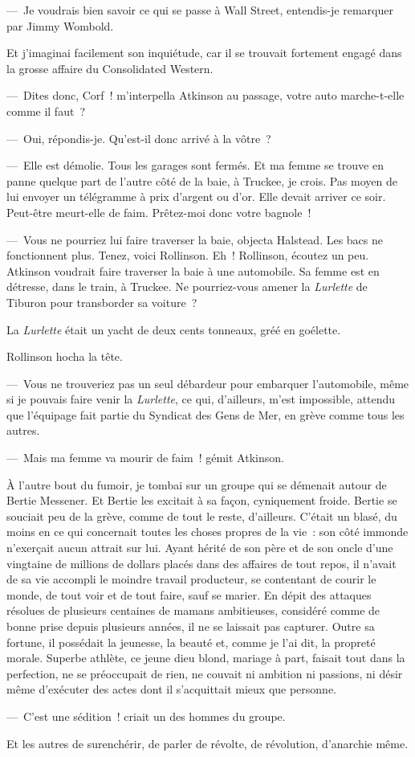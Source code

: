 \documentclass[french,twoside]{book} %
\begin{document}
— Je voudrais bien savoir ce qui se passe à Wall Street, entendis-je remarquer par Jimmy Wombold.\par
Et j’imaginai facilement son inquiétude, car il se trouvait fortement engagé dans la grosse affaire du Consolidated Western.\par
— Dites donc, Corf ! m’interpella Atkinson au passage, votre auto marche-t-elle comme il faut ?\par
— Oui, répondis-je. Qu’est-il donc arrivé à la vôtre ?\par
— Elle est démolie. Tous les garages sont fermés. Et ma femme se trouve en panne quelque part de l’autre côté de la baie, à Truckee, je crois. Pas moyen de lui envoyer un télégramme à prix d’argent ou d’or. Elle devait arriver ce soir. Peut-être meurt-elle de faim. Prêtez-moi donc votre bagnole !\par
— Vous ne pourriez lui faire traverser la baie, objecta Halstead. Les bacs ne fonctionnent plus. Tenez, voici Rollinson. Eh ! Rollinson, écoutez un peu. Atkinson voudrait faire traverser la baie à une automobile. Sa femme est en détresse, dans le train, à Truckee. Ne pourriez-vous amener la \emph{Lurlette} de Tiburon pour transborder sa voiture ?\par
La \emph{Lurlette} était un yacht de deux cents tonneaux, gréé en goélette.\par
Rollinson hocha la tête.\par
— Vous ne trouveriez pas un seul débardeur pour embarquer l’automobile, même si je pouvais faire venir la \emph{Lurlette}, ce qui, d’ailleurs, m’est impossible, attendu que l’équipage fait partie du Syndicat des Gens de Mer, en grève comme tous les autres.\par
— Mais ma femme va mourir de faim ! gémit Atkinson.\par
À l’autre bout du fumoir, je tombai sur un groupe qui se démenait autour de Bertie Messener. Et Bertie les excitait à sa façon, cyniquement froide. Bertie se souciait peu de la grève, comme de tout le reste, d’ailleurs. C’était un blasé, du moins en ce qui concernait toutes les choses propres de la vie : son côté immonde n’exerçait aucun attrait sur lui. Ayant hérité de son père et de son oncle d’une vingtaine de millions de dollars placés dans des affaires de tout repos, il n’avait de sa vie accompli le moindre travail producteur, se contentant de courir le monde, de tout voir et de tout faire, sauf se marier. En dépit des attaques résolues de plusieurs centaines de mamans ambitieuses, considéré comme de bonne prise depuis plusieurs années, il ne se laissait pas capturer. Outre sa fortune, il possédait la jeunesse, la beauté et, comme je l’ai dit, la propreté morale. Superbe athlète, ce jeune dieu blond, mariage à part, faisait tout dans la perfection, ne se préoccupait de rien, ne couvait ni ambition ni passions, ni désir même d’exécuter des actes dont il s’acquittait mieux que personne.\par
— C’est une sédition ! criait un des hommes du groupe.\par
Et les autres de surenchérir, de parler de révolte, de révolution, d’anarchie même.\par
\end{document}
